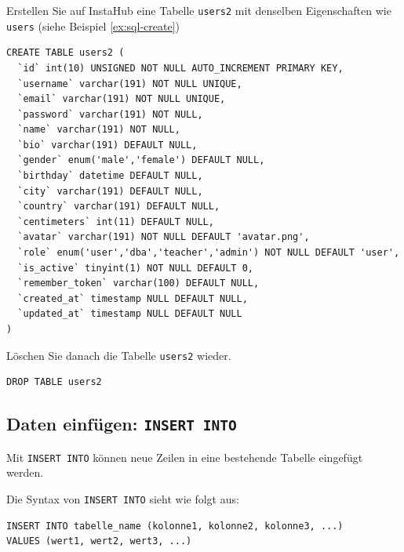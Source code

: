 \begin{myexercise}
  Erstellen Sie auf InstaHub eine Tabelle \texttt{users2} mit denselben Eigenschaften wie \texttt{users} (siehe Beispiel \ref{ex:sql-create})
  \begin{myanswer}
    \begin{lstlisting}
CREATE TABLE users2 (
  `id` int(10) UNSIGNED NOT NULL AUTO_INCREMENT PRIMARY KEY,
  `username` varchar(191) NOT NULL UNIQUE,
  `email` varchar(191) NOT NULL UNIQUE,
  `password` varchar(191) NOT NULL,
  `name` varchar(191) NOT NULL,
  `bio` varchar(191) DEFAULT NULL,
  `gender` enum('male','female') DEFAULT NULL,
  `birthday` datetime DEFAULT NULL,
  `city` varchar(191) DEFAULT NULL,
  `country` varchar(191) DEFAULT NULL,
  `centimeters` int(11) DEFAULT NULL,
  `avatar` varchar(191) NOT NULL DEFAULT 'avatar.png',
  `role` enum('user','dba','teacher','admin') NOT NULL DEFAULT 'user',
  `is_active` tinyint(1) NOT NULL DEFAULT 0,
  `remember_token` varchar(100) DEFAULT NULL,
  `created_at` timestamp NULL DEFAULT NULL,
  `updated_at` timestamp NULL DEFAULT NULL
)
\end{lstlisting}
  \end{myanswer}
\end{myexercise}

\begin{myexercise}
  Löschen Sie danach die Tabelle \texttt{users2} wieder.
  \begin{myanswer}
    \begin{lstlisting}
DROP TABLE users2
\end{lstlisting}
  \end{myanswer}
\end{myexercise}


\subsection{Daten einfügen: \texorpdfstring{\lstinline|INSERT INTO|}{INSERT INTO}}

Mit \lstinline|INSERT INTO| können neue Zeilen in eine bestehende Tabelle eingefügt werden.

Die Syntax von \lstinline|INSERT INTO| sieht wie folgt aus:

\begin{lstlisting}
INSERT INTO tabelle_name (kolonne1, kolonne2, kolonne3, ...)
VALUES (wert1, wert2, wert3, ...)
\end{lstlisting}

